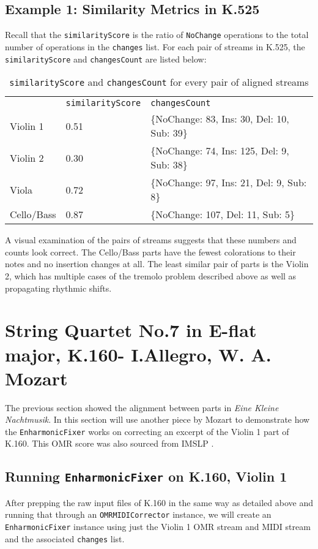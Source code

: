 \subsection{Example 1: Similarity Metrics in K.525}
Recall that the \texttt{similarityScore} is the ratio of \texttt{NoChange} operations to the total number of operations in the \texttt{changes} list. For each pair of streams in K.525, the \texttt{similarityScore} and \texttt{changesCount} are listed below:
\begin{table}[H]
\centering
\begin{tabular}{lll}
           & \texttt{similarityScore} & \texttt{changesCount}                                                  \\
Violin 1   & 0.51                       & \{NoChange: 83, Ins: 30, Del: 10, Sub: 39\} \\
Violin 2   & 0.30                       & \{NoChange: 74, Ins: 125, Del: 9, Sub: 38\} \\
Viola      & 0.72                       & \{NoChange: 97, Ins: 21, Del: 9, Sub: 8\}   \\
Cello/Bass & 0.87                       & \{NoChange: 107, Del: 11, Sub: 5\}               
\end{tabular}
\caption{\texttt{similarityScore} and \texttt{changesCount} for every pair of aligned streams}
\end{table}

A visual examination of the pairs of streams suggests that these numbers and counts look correct. The Cello/Bass parts have the fewest colorations to their notes and no insertion changes at all. The least similar pair of parts is the Violin 2, which has multiple cases of the tremolo problem described above as well as propagating rhythmic shifts.

\section{String Quartet No.7 in E-flat major, K.160- I.Allegro, W. A. Mozart}
The previous section showed the alignment between parts in \textit{Eine Kleine Nachtmusik}. In this section will use another piece by Mozart to demonstrate how the \texttt{EnharmonicFixer} works on correcting an excerpt of the Violin 1 part of K.160. This OMR score was also sourced from IMSLP \cite{k160}.

\subsection{Running \texttt{EnharmonicFixer} on K.160, Violin 1}
After prepping the raw input files of K.160 in the same way as detailed above and running that through an \texttt{OMRMIDICorrector} instance, we will create an \texttt{EnharmonicFixer} instance using just the Violin 1 OMR stream and MIDI stream and the associated \texttt{changes} list.

